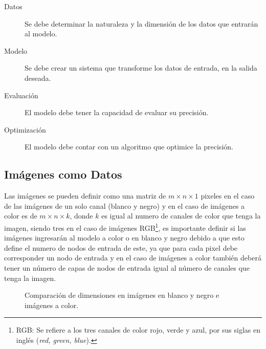 \begin{description}
    \item[Datos]{Se debe determinar la naturaleza y la dimensión de los datos que entrarán al modelo.}
    \item[Modelo] {Se debe crear un sistema que transforme los datos de entrada, en la salida deseada.}
    \item[Evaluación] {El modelo debe tener la capacidad de evaluar su precisión.}
    \item[Optimización] {El modelo debe contar con un algoritmo que optimice la precisión.}
\end{description}

\subsection{Imágenes como Datos}
Las imágenes se pueden definir como una matriz de $m \times n \times 1$ pixeles en el caso de las imágenes de un solo canal (blanco y negro) y en el caso de imágenes a color es de $m \times n \times k$, donde $k$ es igual al numero de canales de color que tenga la imagen, siendo tres en el caso de imágenes RGB\footnote{RGB: Se refiere a los tres canales de color rojo, verde y azul, por sus siglas en inglés (\emph{red, green, blue}).}, es importante definir si las imágenes ingresarán al modelo a color o en blanco y negro debido a que esto define el numero de nodos de entrada de este, ya que para cada pixel debe corresponder un nodo de entrada y en el caso de imágenes a color también deberá tener un número de capas de nodos de entrada igual al número de canales que tenga la imagen.


\begin{figure}[!htp]
    \centering
    \qquad
    \caption{Comparación de dimensiones en imágenes en blanco y negro e imágenes a color.}
\end{figure}

